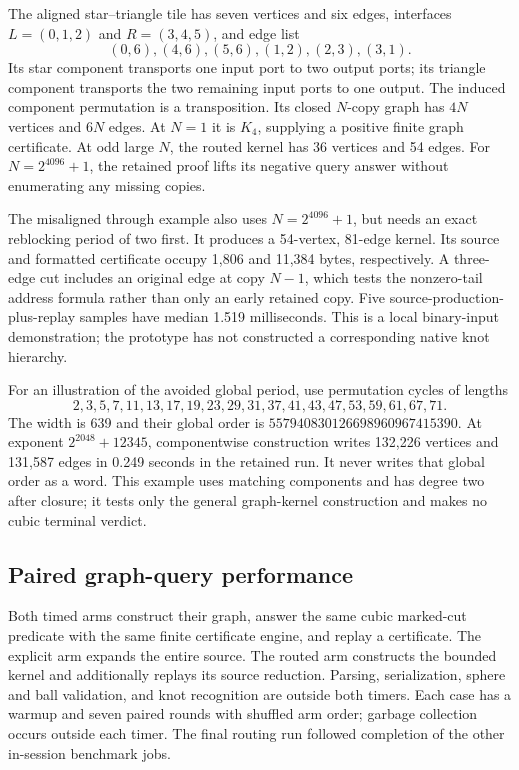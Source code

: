 The aligned star--triangle tile has seven vertices and six edges, interfaces
$L=(0,1,2)$ and $R=(3,4,5)$, and edge list
\[
 (0,6),(4,6),(5,6),(1,2),(2,3),(3,1).
\]
Its star component transports one input port to two output ports; its
triangle component transports the two remaining input ports to one output.
The induced component permutation is a transposition. Its closed $N$-copy
graph has $4N$ vertices and $6N$ edges. At $N=1$ it is $K_4$, supplying a
positive finite graph certificate. At odd large $N$, the routed kernel has
36 vertices and 54 edges. For $N=2^{4096}+1$, the retained proof lifts its
negative query answer without enumerating any missing copies.

The misaligned through example also uses $N=2^{4096}+1$, but needs an
exact reblocking period of two first. It produces a 54-vertex, 81-edge kernel.
Its source and formatted certificate occupy 1,806 and 11,384 bytes,
respectively. A three-edge cut includes an original edge at copy $N-1$,
which tests the nonzero-tail address formula rather than only an early
retained copy. Five source-production-plus-replay samples have median
1.519 milliseconds. This is a local binary-input demonstration; the
prototype has not constructed a corresponding native knot hierarchy.

For an illustration of the avoided global period, use permutation cycles
of lengths
\[
 2,3,5,7,11,13,17,19,23,29,31,37,41,43,47,53,59,61,67,71.
\]
The width is 639 and their global order is
$557940830126698960967415390$. At exponent $2^{2048}+12345$, componentwise
construction writes 132,226 vertices and 131,587 edges in 0.249 seconds in
the retained run. It never writes that global order as a word. This example
uses matching components and has degree two after closure; it tests only
the general graph-kernel construction and makes no cubic terminal verdict.

\subsection{Paired graph-query performance}

Both timed arms construct their graph, answer the same cubic marked-cut
predicate with the same finite certificate engine, and replay a certificate.
The explicit arm expands the entire source. The routed arm constructs the
bounded kernel and additionally replays its source reduction. Parsing,
serialization, sphere and ball validation, and knot recognition are outside
both timers. Each case has a warmup and seven paired rounds with shuffled
arm order; garbage collection occurs outside each timer. The final routing
run followed completion of the other in-session benchmark jobs.

